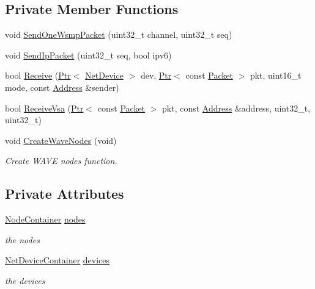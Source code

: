 \subsection*{Private Member Functions}
\begin{DoxyCompactItemize}
\item 
void \hyperlink{classWaveNetDeviceExample_a2dc13b30baad7f9e0a3f23d3dc60557c}{Send\+One\+Wsmp\+Packet} (uint32\+\_\+t channel, uint32\+\_\+t seq)
\item 
void \hyperlink{classWaveNetDeviceExample_a555b10fdbbaa27f47dc1f3487e1dcf0d}{Send\+Ip\+Packet} (uint32\+\_\+t seq, bool ipv6)
\item 
bool \hyperlink{classWaveNetDeviceExample_a2c05ff92e57bc7f5fe4e4417e8e7afe5}{Receive} (\hyperlink{classns3_1_1Ptr}{Ptr}$<$ \hyperlink{classns3_1_1NetDevice}{Net\+Device} $>$ dev, \hyperlink{classns3_1_1Ptr}{Ptr}$<$ const \hyperlink{classns3_1_1Packet}{Packet} $>$ pkt, uint16\+\_\+t mode, const \hyperlink{classns3_1_1Address}{Address} \&sender)
\item 
bool \hyperlink{classWaveNetDeviceExample_aec850cc02853faa2ae58442f7b4ea939}{Receive\+Vsa} (\hyperlink{classns3_1_1Ptr}{Ptr}$<$ const \hyperlink{classns3_1_1Packet}{Packet} $>$ pkt, const \hyperlink{classns3_1_1Address}{Address} \&address, uint32\+\_\+t, uint32\+\_\+t)
\item 
void \hyperlink{classWaveNetDeviceExample_a825285810121c865230f6fafe6428081}{Create\+Wave\+Nodes} (void)
\begin{DoxyCompactList}\small\item\em Create W\+A\+VE nodes function. \end{DoxyCompactList}\end{DoxyCompactItemize}
\subsection*{Private Attributes}
\begin{DoxyCompactItemize}
\item 
\hyperlink{classns3_1_1NodeContainer}{Node\+Container} \hyperlink{classWaveNetDeviceExample_a8a97f5513275ce36c7f3f8d0dabd5a68}{nodes}
\begin{DoxyCompactList}\small\item\em the nodes \end{DoxyCompactList}\item 
\hyperlink{classns3_1_1NetDeviceContainer}{Net\+Device\+Container} \hyperlink{classWaveNetDeviceExample_a4b88c787809e6171c04eba282d1a1715}{devices}
\begin{DoxyCompactList}\small\item\em the devices \end{DoxyCompactList}\end{DoxyCompactItemize}


